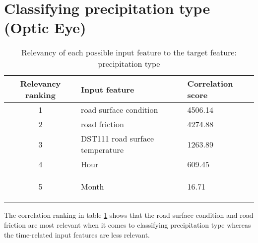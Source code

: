 \section{Classifying precipitation type (Optic Eye)}

	\begin{table}[H]
		\centering
		\caption{Relevancy of each possible input feature to the target feature: precipitation type }
		\begin{tabular}[3]{c | l | l }
    			Relevancy ranking & Input feature & Correlation score  \\
			 \hline
			1 & road surface condition & 4506.14 \\ \hline
			2 & road friction & 4274.88 \\ \hline
			3 & DST111 road surface temperature & 1263.89 \\ \hline
			4 & Hour & 609.45 \\ \hline
			5 & Month & 16.71 
 
			\label{table:feature_comparison_prectype}
		\end{tabular}
	\end{table}

	The correlation ranking in table \ref{table:feature_comparison_prectype} shows that the road surface condition and road friction are most relevant when it comes to classifying precipitation type whereas the time-related input features are less relevant.

